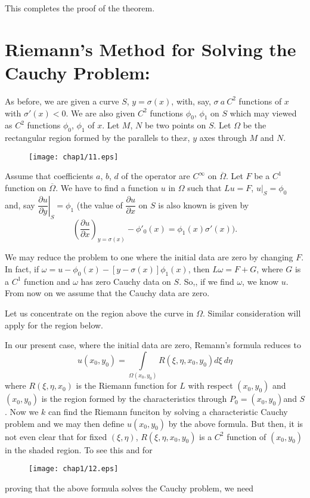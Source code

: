 This completes the proof of the theorem.

\section*{Riemann's Method for Solving the Cauchy Problem:}

As before, we are given a curve $S$, $y=\sigma (x)$, with, say, $\sigma \ a \ C^{2}$ functions of $x$ with $\sigma'(x)<0$. We are also given $C^{2}$ functions $\phi_{0}$, $\phi_{1}$ on $S$ which may viewed as $C^{2}$ functions $\phi_{0}$, $\phi_{1}$ of $x$. Let $M$, $N$ be two points on $S$. Let $\Omega$ be the rectangular region formed by the parallels to the\pageoriginale $x$, $y$ axes through $M$ and $N$.
\begin{figure}[H]
\centering
\texttt{[image: chap1/11.eps]}
\end{figure}
\noindent
Assume that coefficients $a$, $b$, $d$ of the operator are $C^{\infty}$ on $\overline{\Omega}$. Let $F$ be a $C^{1}$ function on $\overline{\Omega}$. We have to find a function $u$ in $\Omega$ such that $Lu=F$, $u\big|_{S}=\phi_{0}$ and, say $\left.\dfrac{\partial u}{\partial y}\right|_{S}=\phi_{1}$ (the value of $\dfrac{\partial u}{\partial x}$ on $S$ is also known is given by
$$
\left(\dfrac{\partial u}{\partial x}\right)_{y=\sigma(x)}-\phi'_{0}(x)=\phi_{1}(x)\sigma'(x)).
$$

We may reduce the problem to one where the initial data are zero by changing $F$. In fact, if $\omega=u-\phi_{0}(x)-[y-\sigma(x)]\phi_{1}(x)$, then $L\omega=F+G$, where $G$ is a $C^{1}$ function and $\omega$ has zero Cauchy data on $S$. So,, if we find $\omega$, we know $u$. From now on we assume that the Cauchy data are zero.

Let us concentrate on the region above the curve in $\Omega$. Similar consideration will apply for the region below.

In our present case, where the initial data are zero, Remann's formula reduces to
$$
u(x_{0},y_{0})=\int\limits_{\Omega(x_{0},y_{0})}R(\xi, \eta, x_{0},y_{0})d\xi \ d\eta
$$
where $R(\xi,\eta,x_{0})$ is the Riemann function for $L$ with respect $(x_{0},y_{0})$ and $(x_{0},y_{0})$ is the region formed by the characteristics through $P_{0}=(x_{0},y_{0})$\pageoriginale and $S$. Now we $k$ can find the Riemann funciton by solving a characteristic Cauchy problem and we may then define $u(x_{0},y_{0})$ by the above formula. But then, it is not even clear that for fixed $(\xi,\eta)$, $R(\xi,\eta,x_{0},y_{0})$ is a $C^{2}$ function of $(x_{0},y_{0})$ in the shaded region. To see this and for 
\begin{figure}[H]
\centering
\texttt{[image: chap1/12.eps]}
\end{figure}
proving that the above formula solves the Cauchy problem, we need

